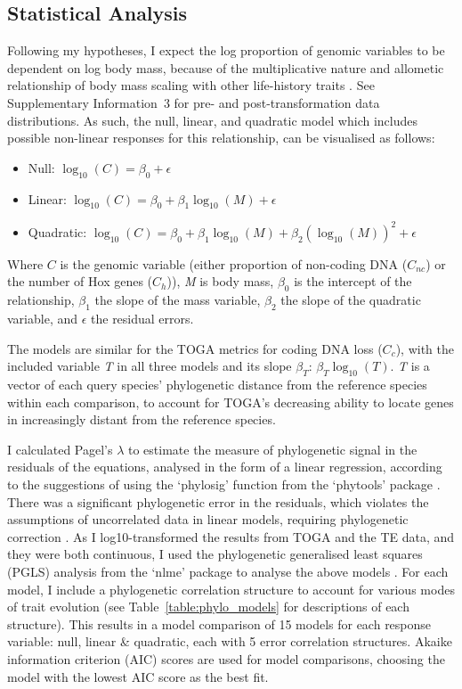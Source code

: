 \documentclass[11pt]{article}
\begin{document}
\subsection{Statistical Analysis}
Following my hypotheses, I expect the log proportion of genomic variables to be dependent on log body mass, because of the multiplicative nature and allometic relationship of body mass scaling with other life-history traits \citep{log-transformation}. See Supplementary Information~3 for pre- and post-transformation data distributions. As such, the null, linear, and quadratic model which includes possible non-linear responses for this relationship, can be visualised as follows:

\begingroup
\begin{itemize}
\setlength\itemsep{-0.1cm}
    \item Null: $\log_{10}(C) = \beta_0 + \epsilon$
    \item Linear: $\log_{10}(C) = \beta_0 + \beta_1 \log_{10}(M) + \epsilon$
    \item Quadratic: $\log_{10}(C) = \beta_0 + \beta_1 \log_{10}(M) + \beta_2 \left(\log_{10}(M)\right)^2 + \epsilon$
\end{itemize}
\endgroup

\noindent Where $C$ is the genomic variable (either proportion of non-coding DNA ($C_{nc}$) or the number of Hox genes ($C_h$)), \textit{M} is body mass, $\beta_0$ is the intercept of the relationship, $\beta_1$ the slope of the mass variable, $\beta_2$ the slope of the quadratic variable, and $\epsilon$ the residual errors. 

The models are similar for the TOGA metrics for coding DNA loss ($C_c$), with the included variable \textit{T} in all three models and its slope $\beta_T$: $\beta_T\log_{10}(T)$. \textit{T} is a vector of each query species' phylogenetic distance from the reference species within each comparison, to account for TOGA's decreasing ability to locate genes in increasingly distant from the reference species.

I calculated Pagel's $\lambda$ to estimate the measure of phylogenetic signal in the residuals of the equations, analysed in the form of a linear regression, according to the suggestions of using the `phylosig' function from the `phytools' package \citep{phytools}. There was a significant phylogenetic error in the residuals, which violates the assumptions of uncorrelated data in linear models, requiring phylogenetic correction \citep{revell2010, statisticalneed}. As I log10-transformed the results from TOGA and the TE data, and they were both continuous, I used the phylogenetic generalised least squares (PGLS) analysis from the `nlme' package to analyse the above models \citep{nlme}. For each model, I include a phylogenetic correlation structure to account for various modes of trait evolution (see Table~\ref{table:phylo_models} for descriptions of each structure). This results in a model comparison of 15 models for each response variable: null, linear \& quadratic, each with 5 error correlation structures. Akaike information criterion (AIC) scores are used for model comparisons, choosing the model with the lowest AIC score as the best fit. 
\end{document}
